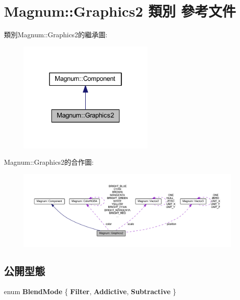 \hypertarget{class_magnum_1_1_graphics2}{}\section{Magnum\+:\+:Graphics2 類別 參考文件}
\label{class_magnum_1_1_graphics2}


類別\+Magnum\+:\+:Graphics2的繼承圖\+:\nopagebreak
\begin{figure}[H]
\begin{center}
\leavevmode
\includegraphics[width=190pt]{class_magnum_1_1_graphics2__inherit__graph}
\end{center}
\end{figure}


Magnum\+:\+:Graphics2的合作圖\+:\nopagebreak
\begin{figure}[H]
\begin{center}
\leavevmode
\includegraphics[width=350pt]{class_magnum_1_1_graphics2__coll__graph}
\end{center}
\end{figure}
\subsection*{公開型態}
\begin{DoxyCompactItemize}
\item 
enum {\bfseries Blend\+Mode} \{ {\bfseries Filter}, 
{\bfseries Addictive}, 
{\bfseries Subtractive}
 \}\hypertarget{class_magnum_1_1_graphics2_a5753d5bf0c8793c73370e14bb96a7b43}{}\label{class_magnum_1_1_graphics2_a5753d5bf0c8793c73370e14bb96a7b43}

\end{DoxyCompactItemize}
